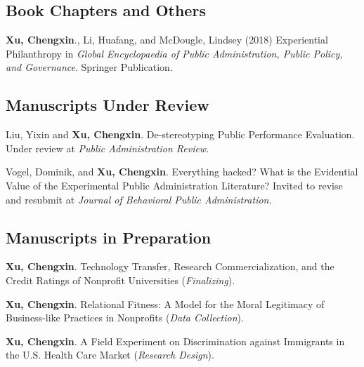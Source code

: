 \documentclass[letterpaper]{article}
\renewenvironment{itemize}{
  \begin{list}{}{
    \setlength{\leftmargin}{1.5em}
  }
}{
  \end{list}
}
\begin{document}
\subsection*{Book Chapters and Others}
\begin{itemize}
	
\item \textbf{Xu, Chengxin}., Li, Huafang, and McDougle, Lindsey (2018) Experiential Philanthropy in {\it Global Encyclopaedia of Public Administration, Public Policy, and Governance}. Springer Publication.

\end{itemize}

\subsection*{Manuscripts Under Review}
\begin{itemize}
	
\item Liu, Yixin and \textbf{Xu, Chengxin}. De-stereotyping Public Performance Evaluation. Under review at {\it Public Administration Review}.

\item Vogel, Dominik, and \textbf{Xu, Chengxin}. Everything hacked? What is the Evidential Value of the Experimental Public Administration Literature? Invited to revise and resubmit at {\it Journal of Behavioral Public Administration}.

\end{itemize}


\subsection*{Manuscripts in Preparation}
\begin{itemize}

\item \textbf{Xu, Chengxin}. Technology Transfer, Research Commercialization, and the Credit Ratings of Nonprofit Universities ({\it Finalizing}).

\item \textbf{Xu, Chengxin}. Relational Fitness: A Model for the Moral Legitimacy of Business-like Practices in Nonprofits ({\it Data Collection}).

\item \textbf{Xu, Chengxin}. A Field Experiment on Discrimination against Immigrants in the U.S. Health Care Market ({\it Research Design}).

\end{itemize}
\end{document}
